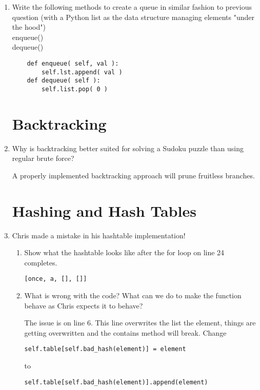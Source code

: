 \documentclass[11pt]{article}
\newenvironment{answer}{\large\lstset{basicstyle=\large}\color{white}}{}
\newenvironment{answer}{\large\lstset{basicstyle=\large}\color{red}}{}
\begin{document}
\begin{enumerate}
\item Write the following methods to create a queue in similar fashion to previous question (with a Python  list as the data structure managing elements "under the hood")\\
	enqueue()\\
	dequeue()

	\begin{answer}
	 \begin{lstlisting}
	def enqueue( self, val ):
		self.lst.append( val )
	def dequeue( self ):
		self.list.pop( 0 )
	\end{lstlisting}
	\end{answer}
	

\section*{Backtracking}

\item Why is backtracking better suited for solving a Sudoku puzzle than
      using regular brute force?

    \begin{answer}
    A properly implemented backtracking approach will prune fruitless branches. 
    \end{answer}

\pagebreak
\section*{Hashing and Hash Tables}

\item Chris made a mistake in his hashtable implementation!

    
    \begin{enumerate}
    \item Show what the hashtable looks like after the for loop on line 24
          completes. 

        \begin{answer}
		\begin{lstlisting}[numbers=none]
[once, a, [], []]
		\end{lstlisting}

        \end{answer}

    \item What is wrong with the code? What can we do to make the function behave as Chris expects it to behave?

        \begin{answer}
        The issue is on line 6. This line overwrites the list the element, things are getting overwritten and the contains method will break. Change 
\begin{lstlisting}[numbers=none]
self.table[self.bad_hash(element)] = element 
\end{lstlisting} to 
\begin{lstlisting}[numbers=none]
self.table[self.bad_hash(element)].append(element)
\end{lstlisting}


\end{answer}
\end{enumerate}
\end{enumerate}
\end{document}
